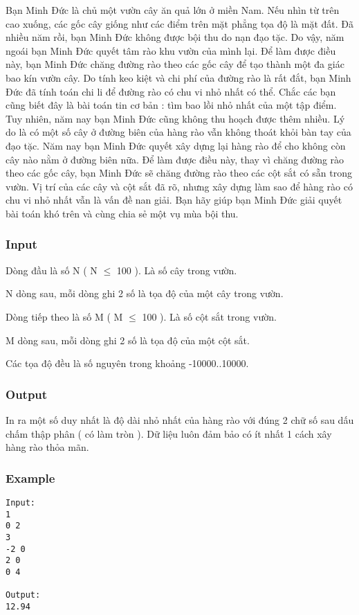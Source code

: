 



   Bạn Minh Đức là chủ một vườn cây ăn quả lớn ở miền Nam. Nếu nhìn từ trên cao xuống, các gốc cây giống như các điểm trên mặt phẳng tọa độ là mặt đất. Đã nhiều năm rồi, bạn Minh Đức không được bội thu do nạn đạo tặc. Do vậy, năm ngoái bạn Minh Đức quyết tâm rào khu vườn của mình lại. Để làm được điều này, bạn Minh Đức chăng đường rào theo các gốc cây để tạo thành một đa giác bao kín vườn cây. Do tính keo kiệt và chi phí của đường rào là rất đắt, bạn Minh Đức đã tính toán chi li để đường rào có chu vi nhỏ nhất có thể. Chắc các bạn cũng biết đây là bài toán tin cơ bản : tìm bao lồi nhỏ nhất của một tập điểm. Tuy nhiên, năm nay bạn Minh Đức cũng không thu hoạch được thêm nhiều. Lý do là có một số cây ở đường biên của hàng rào vẫn không thoát khỏi bàn tay của đạo tặc. Năm nay bạn Minh Đức quyết xây dựng lại hàng rào để cho không còn cây nào nằm ở đường biên nữa. Để làm được điều này, thay vì chăng đường rào theo các gốc cây, bạn Minh Đức sẽ chăng đường rào theo các cột sắt có sẵn trong vườn. Vị trí của các cây và cột sắt đã rõ, nhưng xây dựng làm sao để hàng rào có chu vi nhỏ nhất vẫn là vấn đề nan giải. Bạn hãy giúp bạn Minh Đức giải quyết bài toán khó trên và cùng chia sẻ một vụ mùa bội thu.  

\subsubsection{   Input  }

   Dòng đầu là số N ( N  $\le$  100 ). Là số cây trong vườn.   


   N dòng sau, mỗi dòng ghi 2 số là tọa độ của một cây trong vườn.   


   Dòng tiếp theo là số M ( M  $\le$  100 ). Là số cột sắt trong vườn.   


   M dòng sau, mỗi dòng ghi 2 số là tọa độ của một cột sắt.   


   Các tọa độ đều là số nguyên trong khoảng -10000..10000.  

\subsubsection{   Output  }

   In ra một số duy nhất là độ dài nhỏ nhất của hàng rào với đúng 2 chữ số sau dấu chấm thập phân ( có làm tròn ). Dữ liệu luôn đảm bảo có ít nhất 1 cách xây hàng rào thỏa mãn.  

\subsubsection{   Example  }
\begin{verbatim}
Input:
1
0 2
3
-2 0
2 0
0 4

Output:
12.94
\end{verbatim}
